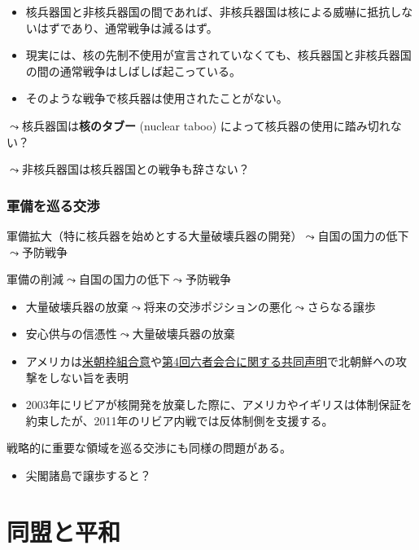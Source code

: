 \documentclass[
  xelatex,
  ja=standard]{bxjsarticle}
\providecommand{\tightlist}{%
  \setlength{\itemsep}{0pt}\setlength{\parskip}{0pt}}\usepackage{longtable,booktabs,array}
\begin{document}
\begin{itemize}
\tightlist
\item
  核兵器国と非核兵器国の間であれば、非核兵器国は核による威嚇に抵抗しないはずであり、通常戦争は減るはず。
\item
  現実には、核の先制不使用が宣言されていなくても、核兵器国と非核兵器国の間の通常戦争はしばしば起こっている。
\item
  そのような戦争で核兵器は使用されたことがない。
\end{itemize}

\(\leadsto\)核兵器国は\textbf{核のタブー} (nuclear taboo)
によって核兵器の使用に踏み切れない？\citep{tannenwald2005}

\(\leadsto\)非核兵器国は核兵器国との戦争も辞さない？

\hypertarget{ux8ecdux5099ux3092ux5de1ux308bux4ea4ux6e09}{%
\subsubsection{軍備を巡る交渉}\label{ux8ecdux5099ux3092ux5de1ux308bux4ea4ux6e09}}

軍備拡大（特に核兵器を始めとする大量破壊兵器の開発）\(\leadsto\)自国の国力の低下\(\leadsto\)予防戦争

軍備の削減\(\leadsto\)自国の国力の低下\(\leadsto\)予防戦争

\begin{itemize}
\tightlist
\item
  大量破壊兵器の放棄\(\leadsto\)将来の交渉ポジションの悪化\(\leadsto\)さらなる譲歩
\item
  安心供与の信憑性\(\leadsto\)大量破壊兵器の放棄
\item
  アメリカは\href{https://peacemaker.un.org/node/1129}{米朝枠組合意}や\href{https://www.mofa.go.jp/mofaj/area/n_korea/6kaigo/ks_050919.html}{第4回六者会合に関する共同声明}で北朝鮮への攻撃をしない旨を表明
\item
  2003年にリビアが核開発を放棄した際に、アメリカやイギリスは体制保証を約束したが、2011年のリビア内戦では反体制側を支援する。
\end{itemize}

戦略的に重要な領域を巡る交渉にも同様の問題がある。

\begin{itemize}
\tightlist
\item
  尖閣諸島で譲歩すると？
\end{itemize}

\hypertarget{ux540cux76dfux3068ux5e73ux548c}{%
\section{同盟と平和}\label{ux540cux76dfux3068ux5e73ux548c}}
\end{document}
